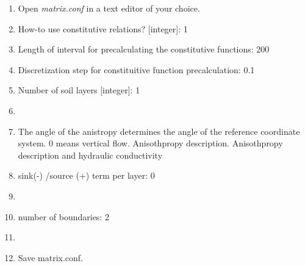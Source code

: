 \begin{enumerate}
\item Open \emph{matrix.conf} in a text editor of your choice. 
\item How-to use constitutive relations? [integer]: 1
\item Length of interval for precalculating the constitutive functions: 200
\item Discretization step for constituitive function precalculation: 0.1
\item Number of soil layers [integer]: 1
\item {}
\item The angle of the anistropy determines the angle of the reference coordinate system. 0 means vertical flow. Anisothpropy description. Anisothpropy description and hydraulic conductivity\\ 
\item sink(-) /source (+) term per layer: 0
\item {}
\item number of boundaries: 2
\item {}
\item Save matrix.conf.

\end{enumerate}

